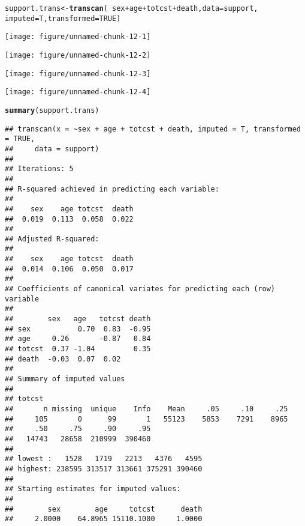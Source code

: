 \documentclass[headinclude=false]{scrartcl}\usepackage[]{graphicx}\usepackage[]{color}
\makeatletter
\def\maxwidth{ %
  \ifdim\Gin@nat@width>\linewidth
    \linewidth
  \else
    \Gin@nat@width
  \fi
}
\newcommand{\hlnum}[1]{\textcolor[rgb]{0.686,0.059,0.569}{#1}}%
\newcommand{\hlopt}[1]{\textcolor[rgb]{0,0,0}{#1}}%
\newcommand{\hlstd}[1]{\textcolor[rgb]{0.345,0.345,0.345}{#1}}%
\newcommand{\hlkwb}[1]{\textcolor[rgb]{0.69,0.353,0.396}{#1}}%
\newcommand{\hlkwc}[1]{\textcolor[rgb]{0.333,0.667,0.333}{#1}}%
\newcommand{\hlkwd}[1]{\textcolor[rgb]{0.737,0.353,0.396}{\textbf{#1}}}%
\newenvironment{kframe}{%
 \def\at@end@of@kframe{}%
 \ifinner\ifhmode%
  \def\at@end@of@kframe{\end{minipage}}%
  \begin{minipage}{\columnwidth}%
 \fi\fi%
 \def\FrameCommand##1{\hskip\@totalleftmargin \hskip-\fboxsep
 \colorbox{shadecolor}{##1}\hskip-\fboxsep
     \hskip-\linewidth \hskip-\@totalleftmargin \hskip\columnwidth}%
 \MakeFramed {\advance\hsize-\width
   \@totalleftmargin\z@ \linewidth\hsize
   \@setminipage}}%
 {\par\unskip\endMakeFramed%
 \at@end@of@kframe}
\newenvironment{knitrout}{}{} %
\makeatother
\begin{document}
\begin{knitrout}
\color{fgcolor}\begin{kframe}
\begin{alltt}
\hlstd{support.trans} \hlkwb{<-} \hlkwd{transcan}\hlstd{(}\hlopt{~} \hlstd{sex} \hlopt{+} \hlstd{age} \hlopt{+} \hlstd{totcst} \hlopt{+} \hlstd{death,} \hlkwc{data} \hlstd{= support,}
                          \hlkwc{imputed} \hlstd{= T,} \hlkwc{transformed}\hlstd{=}\hlnum{TRUE}\hlstd{)}
\end{alltt}
\end{kframe}

{\centering \texttt{[image: figure/unnamed-chunk-12-1]} 

}




{\centering \texttt{[image: figure/unnamed-chunk-12-2]} 

}




{\centering \texttt{[image: figure/unnamed-chunk-12-3]} 

}




{\centering \texttt{[image: figure/unnamed-chunk-12-4]} 

}



\end{knitrout}
\begin{knitrout}
\color{fgcolor}\begin{kframe}
\begin{alltt}
\hlkwd{summary}\hlstd{(support.trans)}
\end{alltt}
\begin{verbatim}
## transcan(x = ~sex + age + totcst + death, imputed = T, transformed = TRUE, 
##     data = support)
## 
## Iterations: 5 
## 
## R-squared achieved in predicting each variable:
## 
##    sex    age totcst  death 
##  0.019  0.113  0.058  0.022 
## 
## Adjusted R-squared:
## 
##    sex    age totcst  death 
##  0.014  0.106  0.050  0.017 
## 
## Coefficients of canonical variates for predicting each (row) variable
## 
##        sex   age   totcst death
## sex           0.70  0.83  -0.95
## age     0.26       -0.87   0.84
## totcst  0.37 -1.04         0.35
## death  -0.03  0.07  0.02       
## 
## Summary of imputed values
## 
## totcst 
##       n missing  unique    Info    Mean     .05     .10     .25 
##     105       0      99       1   55123    5853    7291    8965 
##     .50     .75     .90     .95 
##   14743   28658  210999  390460 
## 
## lowest :   1528   1719   2213   4376   4595
## highest: 238595 313517 313661 375291 390460 
## 
## Starting estimates for imputed values:
## 
##        sex        age     totcst      death 
##     2.0000    64.8965 15110.1000     1.0000
\end{verbatim}
\end{kframe}
\end{knitrout}
\end{document}
